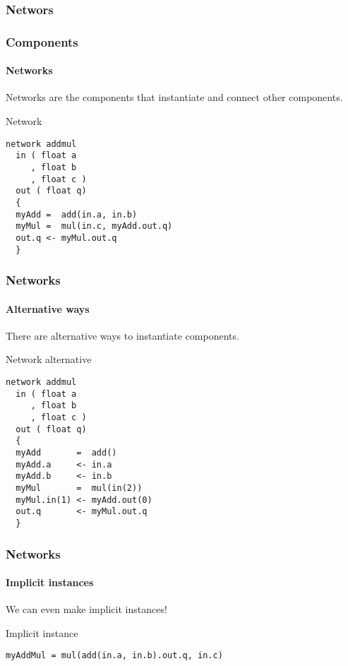 \subsubsection*{Networs}
\begin{frame}[fragile]
\frametitle{Components}
\framesubtitle{Networks}

Networks are the components that instantiate and connect other
components.

\pause
\begin{block}{Network}
\begin{verbatim}
network addmul
  in ( float a
     , float b
     , float c )
  out ( float q)
  {
  myAdd =  add(in.a, in.b)
  myMul =  mul(in.c, myAdd.out.q)
  out.q <- myMul.out.q
  }
\end{verbatim}
\end{block}
\end{frame}


%
%
%
%


\begin{frame}[fragile]
\frametitle{Networks}
\framesubtitle{Alternative ways}

There are alternative ways to instantiate components.

\pause
\begin{block}{Network alternative}
\begin{verbatim}
network addmul
  in ( float a
     , float b
     , float c )
  out ( float q)
  {
  myAdd       =  add()
  myAdd.a     <- in.a
  myAdd.b     <- in.b
  myMul       =  mul(in(2))
  myMul.in(1) <- myAdd.out(0)
  out.q       <- myMul.out.q
  }
\end{verbatim}
\end{block}
\end{frame}


\begin{frame}[fragile]
\frametitle{Networks}
\framesubtitle{Implicit instances}

We can even make implicit instances!

\pause
\begin{block}{Implicit instance}
\end{block}
\verb|myAddMul = mul(add(in.a, in.b).out.q, in.c)|
\end{frame}


